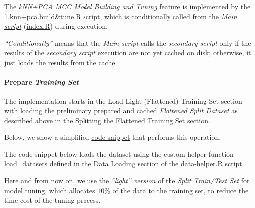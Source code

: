 \documentclass[
]{report}
\begin{document}
The \emph{kNN+PCA MCC Model Building and Tuning} feature is implemented by the \href{https://github.com/AzKurban-edX-DS/edx.capstone.choose-your-own/blob/main/r/models/knn\%2Bpca-mcc/1.knn\%2Bpca.build\%26tune.R}{1.knn+pca.build\&tune.R} script, which is conditionally \href{https://github.com/AzKurban-edX-DS/edx.capstone.choose-your-own/blob/main/r/index.R\#L209}{called from the \emph{Main script}} (\href{https://github.com/AzKurban-edX-DS/edx.capstone.choose-your-own/blob/main/r/index.R}{index.R}) during execution.

\begin{noteblock}
\emph{``Conditionally''} means that the \emph{Main script} calls the \emph{secondary script} only if the results of the \emph{secondary script} execution are not yet cached on disk; otherwise, it just loads the results from the cache.

\end{noteblock}

\paragraph{\texorpdfstring{Prepare \emph{Training Set}}{Prepare Training Set}}\label{knn_pca_mcc.train_set.tuning}

\hfill\break

The implementation starts in the \href{https://github.com/AzKurban-edX-DS/edx.capstone.choose-your-own/blob/main/r/models/knn\%2Bpca-mcc/1.knn\%2Bpca.build\%26tune.R\#L23-L93}{Load Light (Flattened) Training Set} section with loading the preliminary prepared and cached \emph{Flattened Split Dataset} as described \hyperref[ds_flatten.splitting0.1_0.9]{above} in the \hyperref[ds_flatten.splitting0.1_0.9]{Splitting the Flattened Training Set} section.

Below, we show a simplified \href{https://github.com/AzKurban-edX-DS/edx.capstone.choose-your-own/blob/main/r/models/knn\%2Bpca-mcc/1.knn\%2Bpca.build\%26tune.R\#L27-L94}{code snippet} that performs this operation.

\begin{noteblock}
The code snippet below loads the dataset using the custom helper function \href{https://github.com/AzKurban-edX-DS/edx.capstone.choose-your-own/blob/main/r/support-functions/data-helper.R\#L227}{load\_datasets} defined in the \href{https://github.com/AzKurban-edX-DS/edx.capstone.choose-your-own/blob/main/r/support-functions/data-helper.R\#L5-L291}{Data Loading} section of the \href{https://github.com/AzKurban-edX-DS/edx.capstone.choose-your-own/blob/main/r/support-functions/data-helper.R}{data-helper.R} script.

Here and from now on, we use the \emph{``light'' version} of the \emph{Split Train/Test Set} for model tuning, which allocates \(10\)\% of the data to the training set, to reduce the time cost of the tuning process.

\end{noteblock}
\end{document}
